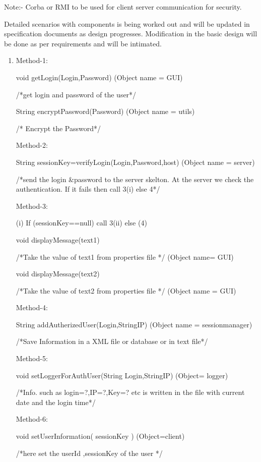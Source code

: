 \documentclass{article}
\begin{document}
\begin{enumerate}
\begin{enumerate}
Note:- Corba or RMI to be used for client server communication for security. 

Detailed scenarios with components is being worked out and will be updated in specification documents as design progresses. Modification in the basic design will be done as per requirements and will be intimated.

\begin{enumerate}
\item[{}{}]
Method-1: 
 
void getLogin(Login,Password) (Object name = GUI) 

/*get login and password of the user*/ 
 
String  encryptPassword(Password) (Object name = utils) 

/* Encrypt the Password*/ 
 
Method-2: 
 
String  sessionKey=verifyLogin(Login,Password,host) (Object name = server) 

/*send the login \&password to the server skelton.  At the server we check the authentication. If it fails then call 3(i) else 4*/  
 
Method-3: 
 
(i) If (sessionKey==null) call 3(ii) else (4) 

void displayMessage(text1)
   
 /*Take the value of text1 from properties file */    (Object name= GUI) 

void displayMessage(text2) 

 /*Take the value of text2 from properties file  */    (Object name = GUI) 
 
Method-4:
 
String addAutherizedUser(Login,StringIP) (Object name = sessionmanager) 

/*Save Information in a XML file or database or in text file*/ 

Method-5: 

void setLoggerForAuthUser(String Login,StringIP) (Object= logger) 

/*Info. such as login=?,IP=?,Key=? etc is written in the file with current date and the login time*/   

Method-6:
 
void setUserInformation( sessionKey ) (Object=client) 

/*here set the userId ,sessionKey of  the user  */
\end{enumerate}
\end{enumerate}
 

\end{enumerate}
\end{document}
